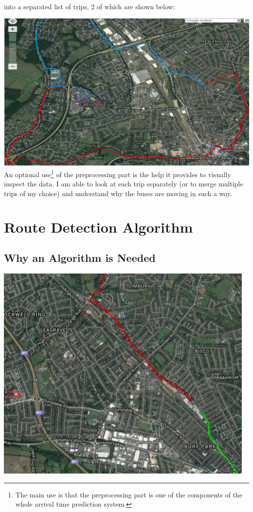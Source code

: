 \documentclass[12pt,a4paper,oneside,openright]{report}
\begin{document}
into a separated list of trips, 2 of which are shown below:

\includegraphics[width=\textwidth]{figs/processed.png} \\

An optional use\footnote{The main use is that the preprocessing part is one of the
components of the whole arrival time prediction system.} of the preprocessing part
is the help it provides to visually inspect the data. I am able to look at each trip
separately (or to merge multiple trips of my choice) and understand why the buses are
moving in such a way.

\section{Route Detection Algorithm}

\subsection{Why an Algorithm is Needed}

\includegraphics[scale=0.8]{figs/route_detector.png} \\
\end{document}
